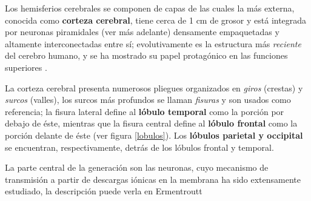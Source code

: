 Los hemisferios cerebrales se componen de capas de las cuales la más externa, conocida como
\textbf{corteza cerebral}, tiene cerca de 1 cm de grosor y está integrada por neuronas piramidales 
(ver más adelante) densamente empaquetadas y altamente interconectadas entre sí; evolutivamente es 
la estructura más \textit{reciente} del cerebro humano, y se ha mostrado su papel protagónico en 
las funciones superiores \cite{Clark98_2}.

La corteza cerebral presenta numerosos pliegues organizados en \textit{giros} (crestas) y
\textit{surcos} (valles), los surcos más profundos se llaman \textit{fisuras} y son usados como 
referencia; la fisura lateral define al \textbf{lóbulo temporal} como la porción por debajo de 
éste, mientras que la fisura central define al \textbf{lóbulo frontal} como la porción delante de 
éste (ver figura \ref{lobulos}). Los \textbf{lóbulos parietal y occipital} se encuentran, 
respectivamente, detrás de los lóbulos frontal y temporal.




La parte central de la generación son las neuronas, cuyo mecanismo de transmisión a partir de
descargas iónicas en la membrana ha sido extensamente estudiado, la descripción puede verla en
Ermentroutt

